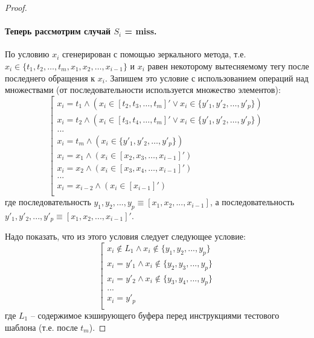 \begin{proof}
  \paragraph{Теперь рассмотрим случай $S_i$ = miss.}
  По условию $x_i$ сгенерирован с помощью зеркального метода, т.е.
  $x_i \in \{t_1, t_2, \dots, t_m, x_1, x_2, \dots, x_{i-1}\}$ и
  $x_i$ равен некоторому вытесняемому тегу после последнего
  обращения к $x_i$. Запишем это условие с использованием операций
  над множествами (от последовательности используется множество
  элементов):
  \begin{equation}\label{xxxxxx1}
  \left[\begin{array}{l}
    x_i = t_1 \wedge (x_i \in [t_2, t_3, \dots, t_m]' \vee x_i \in \{y'_1, y'_2, \dots, y'_p\})\\
    x_i = t_2 \wedge (x_i \in [t_3, t_4, \dots, t_m]' \vee x_i \in \{y'_1, y'_2, \dots, y'_p\})\\
    ...\\
    x_i = t_m \wedge (x_i \in \{y'_1, y'_2, \dots, y'_p\})\\
    x_i = x_1 \wedge (x_i \in [x_2, x_3, \dots, x_{i-1}]')\\
    x_i = x_2 \wedge (x_i \in [x_3, x_4, \dots, x_{i-1}]')\\
    ...\\
    x_i = x_{i-2} \wedge (x_i \in [x_{i-1}]')\\
  \end{array}\right.\end{equation}
  где последовательность $y_1, y_2, ..., y_p \equiv [x_1, x_2, ...,
  x_{i-1}]$, а последовательность $y'_1, y'_2, ..., y'_p \equiv [x_1,
  x_2, ..., x_{i-1}]'$.

  Надо показать, что из этого условия следует следующее условие:
  \begin{equation}\label{yyyyyyyy1}
  \left[ \begin{array}{l}
    x_i \notin L_1 \wedge x_i \notin \{y_1, y_2, ..., y_p\}\\
    x_i = y'_1 \wedge x_i \notin \{y_2, y_3, ..., y_p\}\\
    x_i = y'_2 \wedge x_i \notin \{y_3, y_4, ..., y_p\}\\
    ...\\
    x_i = y'_p\\
  \end{array}\right.
  \end{equation}
  где $L_1$ -- содержимое кэширующего буфера перед инструкциями
  тестового шаблона (т.е. после $t_m$).


\end{proof}
